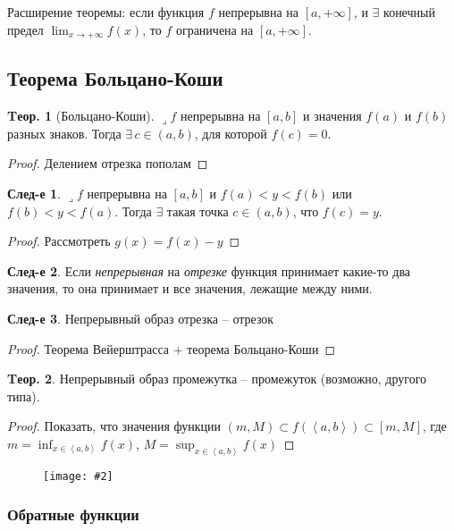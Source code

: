 \documentclass[a4paper,12pt]{article}
\numberwithin{figure}{section}
\newcommand\cfigure[2]{
	\begin{figure}[H] \centering \texttt{[image: \#2]} \end{figure}
}
\theoremstyle{definition}
\newtheorem{theorem}{Tеор.}[section]
\newtheorem*{corollary}{След-е} %
\def\DS{\displaystyle}
\def\intab{\left<a,b\right>}
\def\lets{{\huge$\lrcorner$}\space}
\begin{document}
Расширение теоремы: если функция $f$ непрерывна на $[a,+\infty]$,
и $\exists$ конечный предел $\DS \lim_{x\to+\infty}f(x)$,
то $f$ ограничена на $[a,+\infty]$.


\subsection{Теорема Больцано-Коши}

\begin{theorem}[Больцано-Коши]
	\lets $f$ непрерывна на $[a,b]$ и значения $f(a)$ и $f(b)$ разных знаков.
	Тогда $\exists \, c \in (a,b)$, для которой $f(c)=0$.
\end{theorem}
\begin{proof} Делением отрезка пополам \end{proof}

\begin{corollary}
	\lets $f$ непрерывна на $[a,b]$ и $f(a)<y<f(b)$ или $f(b)<y<f(a)$.
	Тогда $\exists$ такая точка $c\in(a,b)$, что $f(c)=y$.
\end{corollary}
\begin{proof} Рассмотреть $g(x)=f(x)-y$ \end{proof}

\begin{corollary}
	Если \textit{непрерывная} на \textit{отрезке} функция принимает какие-то два значения,
	то она принимает и все значения, лежащие между ними.
\end{corollary}


\begin{corollary}Непрерывный образ отрезка -- отрезок\end{corollary}
\begin{proof} Теорема Вейерштрасса + теорема Больцано-Коши \end{proof}


\begin{theorem}
	Непрерывный образ промежутка -- промежуток (возможно, другого типа).
\end{theorem}
\begin{proof}
	Показать, что значения функции $(m,M) \subset f\left(\intab\right) \subset [m,M]$,
	где $\DS m=\inf_{x\in\intab}f(x)$, $\DS M=\sup_{x\in\intab}f(x)$
\end{proof}


\cfigure{\linewidth}{bolcano-koshi-test-1.png}

\subsubsection{Обратные функции}
\end{document}

